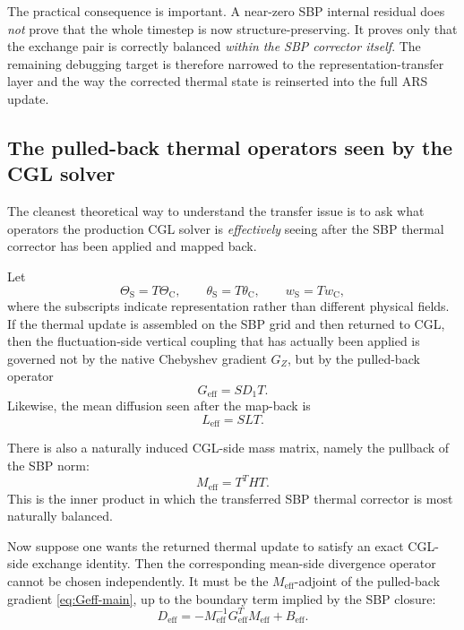 \documentclass[11pt]{article}
\begin{document}
The practical consequence is important. A near-zero SBP internal residual does
\emph{not} prove that the whole timestep is now structure-preserving. It proves
only that the exchange pair is correctly balanced \emph{within the SBP
corrector itself}. The remaining debugging target is therefore narrowed to the
representation-transfer layer and the way the corrected thermal state is
reinserted into the full ARS update.

\subsection{The pulled-back thermal operators seen by the CGL solver}

The cleanest theoretical way to understand the transfer issue is to ask what
operators the production CGL solver is \emph{effectively} seeing after the SBP
thermal corrector has been applied and mapped back.

Let
\[
\Theta_{\mathrm{S}} = T \Theta_{\mathrm{C}},
\qquad
\theta_{\mathrm{S}} = T \theta_{\mathrm{C}},
\qquad
w_{\mathrm{S}} = T w_{\mathrm{C}},
\]
where the subscripts indicate representation rather than different physical
fields. If the thermal update is assembled on the SBP grid and then returned to
CGL, then the fluctuation-side vertical coupling that has actually been applied
is governed not by the native Chebyshev gradient $G_Z$, but by the pulled-back
operator
\begin{equation}
G_{\mathrm{eff}} = S D_1 T.
\label{eq:Geff-main}
\end{equation}
Likewise, the mean diffusion seen after the map-back is
\begin{equation}
L_{\mathrm{eff}} = S L T.
\label{eq:Leff-main}
\end{equation}

There is also a naturally induced CGL-side mass matrix, namely the pullback of
the SBP norm:
\begin{equation}
M_{\mathrm{eff}} = T^T H T.
\label{eq:Meff-main}
\end{equation}
This is the inner product in which the transferred SBP thermal corrector is
most naturally balanced.

Now suppose one wants the returned thermal update to satisfy an exact
CGL-side exchange identity. Then the corresponding mean-side divergence
operator cannot be chosen independently. It must be the
$M_{\mathrm{eff}}$-adjoint of the pulled-back gradient
\eqref{eq:Geff-main}, up to the boundary term implied by the SBP closure:
\begin{equation}
D_{\mathrm{eff}}
=
- M_{\mathrm{eff}}^{-1} G_{\mathrm{eff}}^T M_{\mathrm{eff}}
+ B_{\mathrm{eff}}.
\label{eq:Deff-main}
\end{equation}
\end{document}
